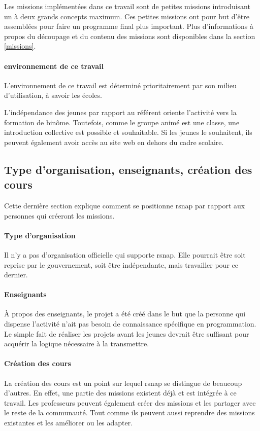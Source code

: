 Les \glspl{mission} implémentées dans ce travail sont de petites \glspl{mission} introduisant un à deux grands concepts maximum. Ces petites \glspl{mission} ont pour but d'être assemblées pour faire un programme final plus important. Plus d'informations à propos du découpage et du contenu des \glspl{mission} sont disponibles dans la section \ref{missions}.

\paragraph{environnement de ce travail}
L'environnement de ce travail est déterminé prioritairement par son milieu d'utilisation, à savoir les écoles.

L'indépendance des jeunes par rapport au référent oriente l'activité vers la formation de binôme. Toutefois, comme le groupe animé est une classe, une introduction collective est possible et souhaitable.
Si les jeunes le souhaitent, ils peuvent également avoir accès au site web en dehors du cadre scolaire.

\subsection{Type d'organisation, enseignants, création des cours}
Cette dernière section explique comment se positionne \gls{rsnap} par rapport aux personnes qui créeront les \glspl{mission}.

\paragraph{Type d'organisation}
Il n'y a pas d'organisation officielle qui supporte \gls{rsnap}. Elle pourrait être soit reprise par le gouvernement, soit être indépendante, mais travailler pour ce dernier.

\paragraph{Enseignants}
À propos des enseignants, le projet a été créé dans le but que la personne qui dispense l'activité n'ait pas besoin de connaissance spécifique en programmation. Le simple fait de réaliser les projets avant les jeunes devrait être suffisant pour acquérir la logique nécessaire à la transmettre.

\paragraph{Création des cours}
La création des cours est un point sur lequel \gls{rsnap} se distingue de beaucoup d'autres. En effet, une partie des \glspl{mission} existent déjà et est intégrée à ce travail. Les professeurs peuvent également créer des \glspl{mission} et les partager avec le reste de la communauté. Tout comme ils peuvent aussi reprendre des \glspl{mission} existantes et les améliorer ou les adapter.

